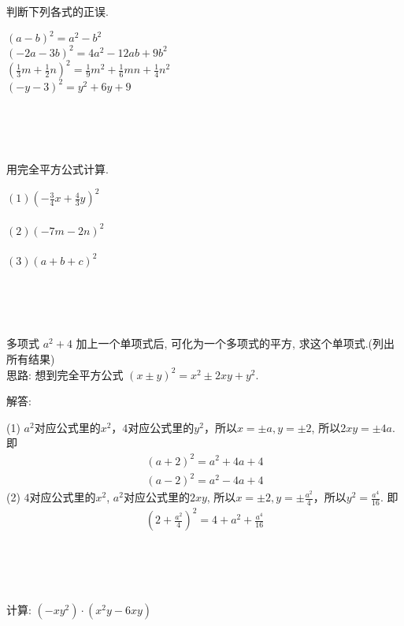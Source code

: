 \item{
    判断下列各式的正误.

    $(a-b)^2 = a^2 - b^2$\\
    $(-2a-3b)^2 = 4a^2 - 12ab +9b^2$\\
    $(\frac13 m + \frac12 n)^2 = \frac19 m^2 + \frac16 mn + \frac14 n^2$\\
    $(-y-3)^2 = y^2 + 6y + 9$
}
\\ \\ \\

\item{
    用完全平方公式计算.

    $(1) (-\frac34 x + \frac43 y)^2$ \\ \\

    $(2) (-7m-2n)^2$ \\ \\
    
    $(3) (a+b+c)^2$ \\ \\
}
\\ \\

\item{
    多项式 $a^2 + 4$ 加上一个单项式后, 可化为一个多项式的平方, 求这个单项式.(列出所有结果)
    \ifshowSolution
    \fangsong{}
    \\
    思路: 想到完全平方公式 $(x\pm y)^2 = x^2 \pm 2xy + y^2$.

    解答: 

    (1) $a^2$对应公式里的$x^2$，$4$对应公式里的$y^2$，所以$x= \pm a, y= \pm 2$, 所以$2xy = \pm 4a$. 即
    \begin{align*}
        (a+2)^2 = a^2 + 4a + 4 \\
        (a-2)^2 = a^2 - 4a + 4
    \end{align*}
    (2) $4$对应公式里的$x^2$, $a^2$对应公式里的$2xy$, 所以$x= \pm 2, y=\pm \frac{a^2}{4}$，所以$y^2 = \frac{a^4}{16}$. 即
    \begin{align*}
        (2 + \frac{a^2}{4})^2 = 4 + a^2 + \frac{a^4}{16}
    \end{align*}
    \fi
}
\\ \\ \\

\item{
    计算: $(-xy^2)\cdot (x^2y - 6xy)$
}
\\ \\ \\

